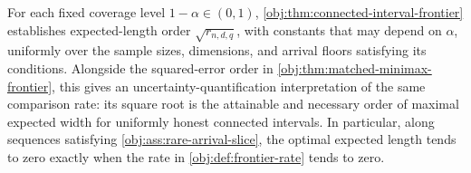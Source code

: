 For each fixed coverage level \(1-\alpha\in(0,1)\), \cref{obj:thm:connected-interval-frontier} establishes expected-length order \(\sqrt{r_{n,d,q}}\), with constants that may depend on \(\alpha\), uniformly over the sample sizes, dimensions, and arrival floors satisfying its conditions. Alongside the squared-error order in \cref{obj:thm:matched-minimax-frontier}, this gives an uncertainty-quantification interpretation of the same comparison rate: its square root is the attainable and necessary order of maximal expected width for uniformly honest connected intervals. In particular, along sequences satisfying \cref{obj:ass:rare-arrival-slice}, the optimal expected length tends to zero exactly when the rate in \cref{obj:def:frontier-rate} tends to zero.
